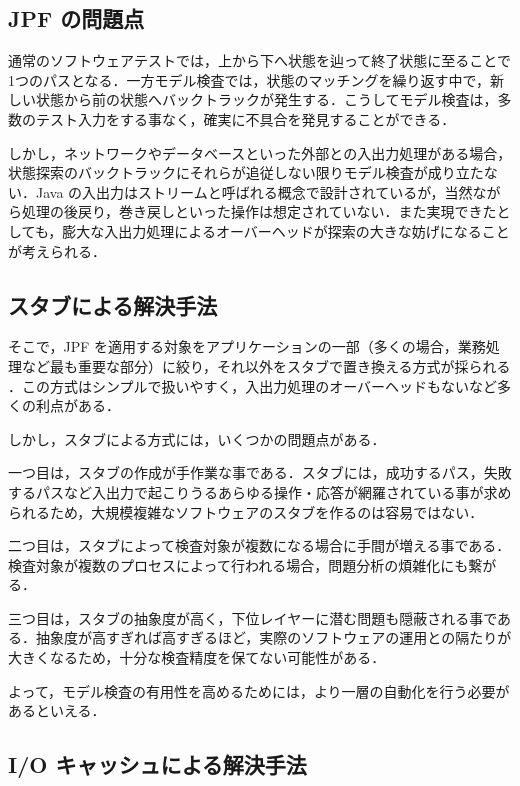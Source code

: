\documentclass[a4j,12pt]{jarticle}
\begin{document}
\subsection{JPF の問題点}

通常のソフトウェアテストでは，上から下へ状態を辿って終了状態に至ることで1つのパスとなる．一方モデル検査では，状態のマッチングを繰り返す中で，新しい状態から前の状態へバックトラックが発生する．こうしてモデル検査は，多数のテスト入力をする事なく，確実に不具合を発見することができる．

しかし，ネットワークやデータベースといった外部との入出力処理がある場合，状態探索のバックトラックにそれらが追従しない限りモデル検査が成り立たない．Java の入出力はストリームと呼ばれる概念で設計されているが，当然ながら処理の後戻り，巻き戻しといった操作は想定されていない．また実現できたとしても，膨大な入出力処理によるオーバーヘッドが探索の大きな妨げになることが考えられる．

\subsection{スタブによる解決手法}

そこで，JPF を適用する対象をアプリケーションの一部（多くの場合，業務処理など最も重要な部分）に絞り，それ以外をスタブで置き換える方式が採られる \cite{DBLP:conf/rv/Artho10}．この方式はシンプルで扱いやすく，入出力処理のオーバーヘッドもないなど多くの利点がある．

しかし，スタブによる方式には，いくつかの問題点がある．

一つ目は，スタブの作成が手作業な事である．スタブには，成功するパス，失敗するパスなど入出力で起こりうるあらゆる操作・応答が網羅されている事が求められるため，大規模複雑なソフトウェアのスタブを作るのは容易ではない．

二つ目は，スタブによって検査対象が複数になる場合に手間が増える事である．検査対象が複数のプロセスによって行われる場合，問題分析の煩雑化にも繋がる．

三つ目は，スタブの抽象度が高く，下位レイヤーに潜む問題も隠蔽される事である．抽象度が高すぎれば高すぎるほど，実際のソフトウェアの運用との隔たりが大きくなるため，十分な検査精度を保てない可能性がある．

よって，モデル検査の有用性を高めるためには，より一層の自動化を行う必要があるといえる．

\subsection{I/O キャッシュによる解決手法}
\end{document}
